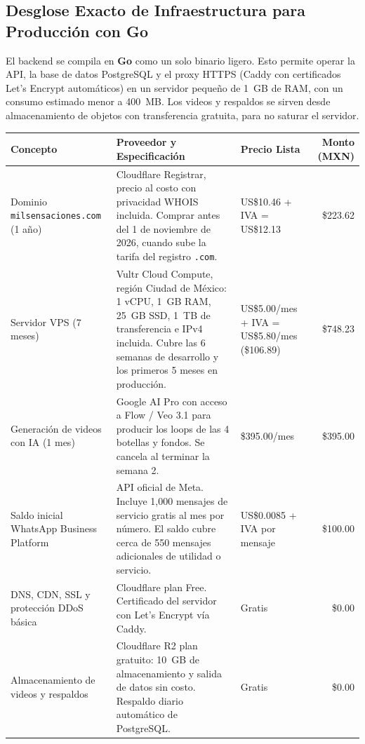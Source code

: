 \documentclass[11pt,letterpaper]{article}
\begin{document}
\subsection{Desglose Exacto de Infraestructura para Producción con Go}
\label{sec:infra}

El backend se compila en \textbf{Go} como un solo binario ligero. Esto permite operar la API, la base de datos PostgreSQL y el proxy HTTPS (Caddy con certificados Let's Encrypt automáticos) en un servidor pequeño de 1~GB de RAM, con un consumo estimado menor a 400~MB. Los videos y respaldos se sirven desde almacenamiento de objetos con transferencia gratuita, para no saturar el servidor.

\begin{table}[H]
\centering
\small
\begin{tabularx}{\textwidth}{>{\raggedright\arraybackslash}p{3.4cm}>{\raggedright\arraybackslash}X>{\raggedright\arraybackslash}p{2.6cm}r}
\toprule
\rowcolor{MezcalAgave!15}
\textbf{Concepto} & \textbf{Proveedor y Especificación} & \textbf{Precio Lista} & \textbf{Monto (MXN)} \\
\midrule
Dominio \texttt{milsensaciones.com} (1 año) & Cloudflare Registrar, precio al costo con privacidad WHOIS incluida. Comprar antes del 1 de noviembre de 2026, cuando sube la tarifa del registro \texttt{.com}. & US\$10.46 + IVA = US\$12.13 & \$223.62 \\
\midrule
Servidor VPS (7 meses) & Vultr Cloud Compute, región Ciudad de México: 1 vCPU, 1~GB RAM, 25~GB SSD, 1~TB de transferencia e IPv4 incluida. Cubre las 6 semanas de desarrollo y los primeros 5 meses en producción. & US\$5.00/mes + IVA = US\$5.80/mes (\$106.89) & \$748.23 \\
\midrule
Generación de videos con IA (1 mes) & Google AI Pro con acceso a Flow / Veo 3.1 para producir los loops de las 4 botellas y fondos. Se cancela al terminar la semana 2. & \$395.00/mes & \$395.00 \\
\midrule
Saldo inicial WhatsApp Business Platform & API oficial de Meta. Incluye 1,000 mensajes de servicio gratis al mes por número. El saldo cubre cerca de 550 mensajes adicionales de utilidad o servicio. & US\$0.0085 + IVA por mensaje & \$100.00 \\
\midrule
DNS, CDN, SSL y protección DDoS básica & Cloudflare plan Free. Certificado del servidor con Let's Encrypt vía Caddy. & Gratis & \$0.00 \\
\midrule
Almacenamiento de videos y respaldos & Cloudflare R2 plan gratuito: 10~GB de almacenamiento y salida de datos sin costo. Respaldo diario automático de PostgreSQL. & Gratis & \$0.00 \\

\end{tabularx}
\end{table}
\end{document}
